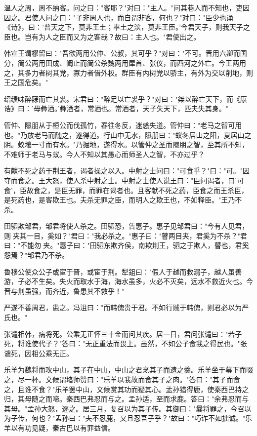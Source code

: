 \documentclass[]{article}
\begin{document}
温人之周，周不纳客。问之曰："客耶？"对曰："主人。"问其巷人而不知也，吏因囚之。君使人问之曰："子非周人也，而自谓非客，何也？"对曰："臣少也诵《诗》，曰：'普天之下，莫非王土；率土之滨，莫非王臣。'今君天子，则我天子之臣也。岂有为人之臣而又为之客哉？故曰：主人也。"君使出之。

韩宣王谓樛留曰："吾欲两用公仲、公叔，其可乎？"对曰："不可。晋用六卿而国分，简公两用田成、阚止而简公杀魏两用犀首、张仪，而西河之外亡。今王两用之，其多力者树其党，寡力者借外权。群臣有内树党以骄主，有外为交以削地，则王之国危矣。"

绍绩味醉寐而亡其裘。宋君曰："醉足以亡裘乎？"对曰："桀以醉亡天下，而《康诰》曰：'毋彝酒。'彝酒者，常酒也。常酒者，天子失天下，匹夫失其身。"

管仲、隰朋从于桓公而伐孤竹，春往冬反，迷惑失道。管仲曰："老马之智可用也。"乃放老马而随之，遂得道。行山中无水，隰朋曰："蚁冬居山之阳，夏居山之阴。蚁壤一寸而有水。"乃掘地，遂得水。以管仲之圣而隰朋之智，至其所不知，不难师于老马与蚁。今人不知以其愚心而师圣人之智，不亦过乎？

有献不死之药于荆王者，谒者操之以入。中射之士问曰："可食乎？"曰："可。"因夺而食之。王大怒，使人杀中射之士。中射之士使人说王曰："臣问谒者，曰'可食'，臣故食之，是臣无罪，而罪在谒者也。且客献不死之药，臣食之而王杀臣，是死药也，是客欺王也。夫杀无罪之臣，而明人之欺王也，不如释臣。"王乃不杀。

田驷欺邹君，邹君将使人杀之。田驷恐，告惠子。惠子见邹君曰："今有人见君，则夹其一目，奚如？"君曰："我必杀之。"惠子曰："瞽两目夹，君奚为不杀？"君曰："不能勿夹。"惠子曰："田驷东欺齐侯，南欺荆王，驷之于欺人，瞽也，君奚怨焉？"邹君乃不杀。

鲁穆公使众公子或宦于晋，或宦于荆。犁鉏曰："假人于越而救溺子，越人虽善游，子必不生矣。失火而取水于海，海水虽多，火必不灭矣，远水不救近火也。今晋与荆虽强，而齐近，鲁患其不救乎！"

严遂不善周君，患之。冯沮曰："而韩傀贵于君。不如行贼于韩傀，则君必以为严氏也。"

张谴相韩，病将死。公乘无正怀三十金而问其疾。居一日，君问张谴曰："若子死，将谁使代子？"答曰："无正重法而畏上。虽然，不如公子食我之得民也。"张谴死，因相公乘无正。

乐羊为魏将而攻中山，其子在中山，中山之君烹其子而遗之羹。乐羊坐于幕下而啜之，尽一杯。文候谓堵师赞曰："乐羊以我故而食其子之肉。"答曰："其子而食之，且谁不食？"乐羊罢中山，文候赏其功而疑其心。孟孙猎得鹿，使秦西巴持之归，其母随之而啼。秦西巴弗忍而与之。孟孙适，至而求鹿。答曰："余弗忍而与其母。"孟孙大怒，逐之。居三月，复召以为其子传。其御曰："曩将罪之，今召以为子传，何也？"孟孙曰："夫不忍鹿，又且忍吾子乎？"故曰："巧诈不如拙诚。"乐羊以有功见疑，秦古巴以有罪益信。
\end{document}
